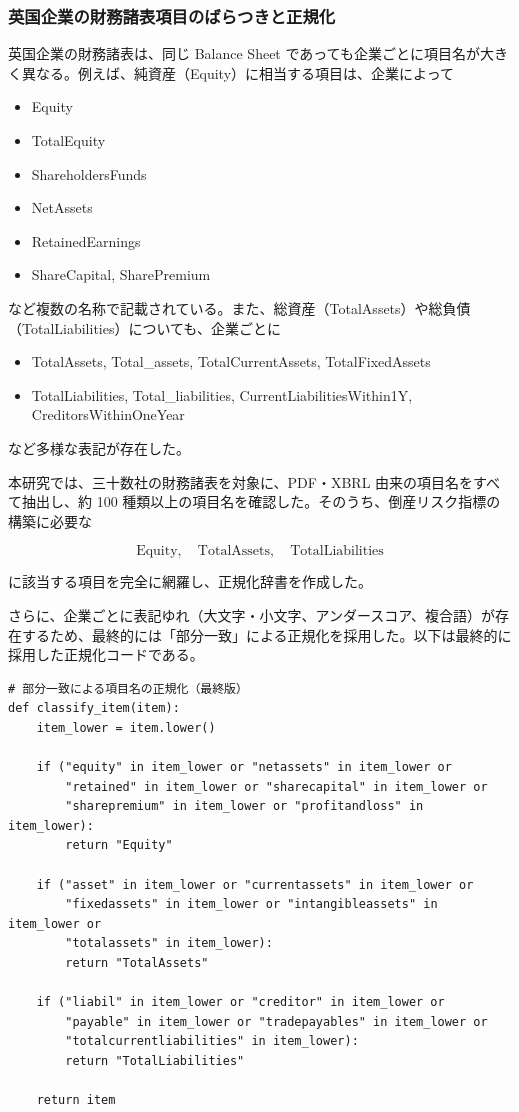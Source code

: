 \subsubsection*{英国企業の財務諸表項目のばらつきと正規化}
英国企業の財務諸表は、同じ Balance Sheet であっても企業ごとに項目名が大きく異なる。例えば、純資産（Equity）に相当する項目は、企業によって
\begin{itemize}
    \item Equity
    \item TotalEquity
    \item ShareholdersFunds
    \item NetAssets
    \item RetainedEarnings
    \item ShareCapital, SharePremium
\end{itemize}
など複数の名称で記載されている。また、総資産（TotalAssets）や総負債（TotalLiabilities）についても、企業ごとに
\begin{itemize}
    \item TotalAssets, Total\_assets, TotalCurrentAssets, TotalFixedAssets
    \item TotalLiabilities, Total\_liabilities, CurrentLiabilitiesWithin1Y, CreditorsWithinOneYear
\end{itemize}
など多様な表記が存在した。

本研究では、三十数社の財務諸表を対象に、PDF・XBRL 由来の項目名をすべて抽出し、約 100 種類以上の項目名を確認した。そのうち、倒産リスク指標の構築に必要な


\[
\text{Equity},\quad \text{TotalAssets},\quad \text{TotalLiabilities}
\]


に該当する項目を完全に網羅し、正規化辞書を作成した。

さらに、企業ごとに表記ゆれ（大文字・小文字、アンダースコア、複合語）が存在するため、最終的には「部分一致」による正規化を採用した。以下は最終的に採用した正規化コードである。

\begin{verbatim}
# 部分一致による項目名の正規化（最終版）
def classify_item(item):
    item_lower = item.lower()

    if ("equity" in item_lower or "netassets" in item_lower or
        "retained" in item_lower or "sharecapital" in item_lower or
        "sharepremium" in item_lower or "profitandloss" in item_lower):
        return "Equity"

    if ("asset" in item_lower or "currentassets" in item_lower or
        "fixedassets" in item_lower or "intangibleassets" in item_lower or
        "totalassets" in item_lower):
        return "TotalAssets"

    if ("liabil" in item_lower or "creditor" in item_lower or
        "payable" in item_lower or "tradepayables" in item_lower or
        "totalcurrentliabilities" in item_lower):
        return "TotalLiabilities"

    return item
\end{verbatim}

